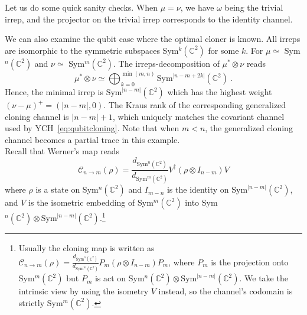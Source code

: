\documentclass[11pt,letterpaper]{article}
\begin{document}
Let us do some quick sanity checks. When $\mu=\nu$, we have $\omega$ being the trivial irrep, and the projector on the trivial irrep corresponds to the identity channel. 

We can also examine the qubit case where the optimal cloner is known. All irreps are isomorphic to the symmetric subspaces Sym$^k(\mathbb{C}^2)$ for some $k$. For $\mu\simeq$ Sym$^n(\mathbb{C}^2)$ and $\nu\simeq$ Sym$^m(\mathbb{C}^2)$. The irreps-decomposition of $\mu^*\otimes\nu$ reads
\begin{equation}
    \mu^*\otimes\nu \simeq \bigoplus_{k=0}^{\min(m,n)} \mathrm{Sym}^{|n-m+2k|}(\mathbb{C}^2)\ .
\end{equation}
Hence, the minimal irrep is $\mathrm{Sym}^{|n-m|}(\mathbb{C}^2)$ which has the highest weight $(\nu-\mu)^+=(|n-m|,0)$. The Kraus rank of the corresponding generalized cloning channel is $|n-m|+1$, which uniquely matches the covariant channel used by YCH~\eqref{eq:qubitcloning}. Note that when $m<n$, the generalized cloning channel becomes a partial trace in this example.\\

Recall that Werner's map reads
\begin{equation}
    \mathcal{C}_{n \to m}(\rho) = \frac{d_{\mathrm{Sym}^n(\mathbb{C}^2)}}{d_{\mathrm{Sym}^m(\mathbb{C}^2)}}V^\dagger(\rho\otimes I_{n-m})V
\end{equation}
where $\rho$ is a state on Sym$^n(\mathbb{C}^2)$ and $I_{m-n}$ is the identity on $\mathrm{Sym}^{|n-m|}(\mathbb{C}^2)$, and $V$ is the isometric embedding of Sym$^m(\mathbb{C}^2)$ into Sym$^n(\mathbb{C}^2)\otimes \mathrm{Sym}^{|n-m|}(\mathbb{C}^2)$.\footnote{Usually the cloning map is written as $\mathcal{C}_{n \to m}(\rho) = \frac{d_{\mathrm{Sym}^n(\mathbb{C}^2)}}{d_{\mathrm{Sym}^m(\mathbb{C}^2)}}P_m(\rho\otimes I_{n-m})P_m$, where $P_m$ is the projection onto Sym$^m(\mathbb{C}^2)$ but $P_m$ is act on Sym$^n(\mathbb{C}^2)\otimes \mathrm{Sym}^{|n-m|}(\mathbb{C}^2)$. We take the intrinsic view by using the isometry $V$ instead, so the channel's codomain is strictly Sym$^m(\mathbb{C}^2)$.}
\end{document}
